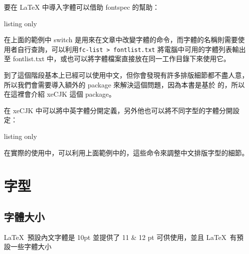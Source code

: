 要在 LaTeX 中導入字體可以借助 fontspec 的幫助：

\begin{tcblisting}{listing only}
\end{tcblisting}

在上面的範例中 switch 是用來在文章中改變字體的命令，而字體的名稱則需要使用者自行查詢，可以利用\verb|fc-list > fontlist.txt| 將電腦中可用的字體列表輸出至 fontlist.txt 中，或也可以將字體檔案直接放在同一工作目錄下來使用它。

到了這個階段基本上已經可以使用中文，但你會發現有許多排版細節都不盡人意，所以我們會需要導入額外的 package 來解決這個問題，因為本書是基於 \XeLaTeX 的，所以在這裡會介紹 xeCJK 這個 package。

在 xeCJK 中可以將中英字體分開定義，另外他也可以將不同字型的字體分開設定：

\begin{tcblisting}{listing only}
\usepackage{xeCJK}
\newCJKfontfamily{}%
\end{tcblisting}

在實際的使用中，可以利用上面範例中的，這些命令來調整中文排版字型的細節。
\section{字型}

\subsection{字體大小}

\LaTeX\ 預設內文字體是 10pt 並提供了 11 \& 12 pt 可供使用，並且 \LaTeX\ 有預設一些字體大小

